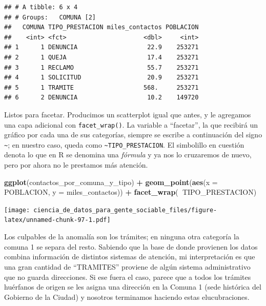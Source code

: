 \documentclass[spanish,]{book}
\newenvironment{Shaded}{\begin{snugshade}}{\end{snugshade}}
\newcommand{\DataTypeTok}[1]{\textcolor[rgb]{0.13,0.29,0.53}{#1}}
\newcommand{\KeywordTok}[1]{\textcolor[rgb]{0.13,0.29,0.53}{\textbf{#1}}}
\newcommand{\NormalTok}[1]{#1}
\newcommand{\OperatorTok}[1]{\textcolor[rgb]{0.81,0.36,0.00}{\textbf{#1}}}
\newcommand{\StringTok}[1]{\textcolor[rgb]{0.31,0.60,0.02}{#1}}
\begin{document}
\begin{verbatim}
## # A tibble: 6 x 4
## # Groups:   COMUNA [2]
##   COMUNA TIPO_PRESTACION miles_contactos POBLACION
##    <int> <fct>                     <dbl>     <int>
## 1      1 DENUNCIA                   22.9    253271
## 2      1 QUEJA                      17.4    253271
## 3      1 RECLAMO                    55.7    253271
## 4      1 SOLICITUD                  20.9    253271
## 5      1 TRAMITE                   568.     253271
## 6      2 DENUNCIA                   10.2    149720
\end{verbatim}

Listos para facetar. Producimos un scatterplot igual que antes, y le agregamos una capa adicional con \texttt{facet\_wrap()}. La variable a ``facetar'', la que recibirá un gráfico por cada una de sus categorías, siempre se escribe a continuación del signo \texttt{\textasciitilde{}}; en nuestro caso, queda como \texttt{\textasciitilde{}TIPO\_PRESTACION}. El simbolillo en cuestión denota lo que en R se denomina una \emph{fórmula} y ya nos lo cruzaremos de nuevo, pero por ahora no le prestamos más atención.

\begin{Shaded}
\begin{Highlighting}[]
\KeywordTok{ggplot}\NormalTok{(contactos_por_comuna_y_tipo) }\OperatorTok{+}\StringTok{ }
\StringTok{    }\KeywordTok{geom_point}\NormalTok{(}\KeywordTok{aes}\NormalTok{(}\DataTypeTok{x =}\NormalTok{ POBLACION, }\DataTypeTok{y =}\NormalTok{ miles_contactos)) }\OperatorTok{+}
\StringTok{    }\KeywordTok{facet_wrap}\NormalTok{(}\OperatorTok{~}\NormalTok{TIPO_PRESTACION)}
\end{Highlighting}
\end{Shaded}

\texttt{[image: ciencia\_de\_datos\_para\_gente\_sociable\_files/figure-latex/unnamed-chunk-97-1.pdf]}

Los culpables de la anomalía son los trámites; en ninguna otra categoría la comuna 1 se separa del resto. Sabiendo que la base de donde provienen los datos combina información de distintos sistemas de atención, mi interpretación es que una gran cantidad de ``TRAMITES'' proviene de algún sistema administrativo que no guarda direcciones. Si ese fuera el caso, parece que a todos los trámites huérfanos de origen se les asigna una dirección en la Comuna 1 (sede histórica del Gobierno de la Ciudad) y nosotros terminamos haciendo estas elucubraciones.
\end{document}

